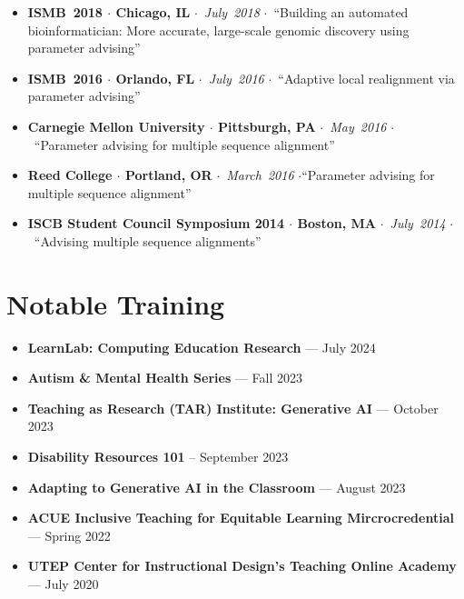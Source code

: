 \documentclass[10pt,letterpaper]{article}
\newcommand{\bigdot}{$\cdot$\xspace}
\begin{document}
\begin{itemize}[leftmargin=*,labelindent=5pt,itemindent=-15pt]
    \item \textbf{ISMB~2018 \bigdot Chicago, IL} \bigdot~\textit{July~2018} \bigdot~``Building an automated bioinformatician: More accurate, large-scale genomic discovery using parameter advising''
    \item \textbf{ISMB~2016 \bigdot Orlando, FL} \bigdot~\textit{July~2016} \bigdot~``Adaptive local realignment via parameter advising'' 
    \item \textbf{Carnegie Mellon University \bigdot Pittsburgh, PA} \bigdot~\textit{May~2016} \bigdot~``Parameter advising for multiple sequence alignment''
    \item \textbf{Reed College \bigdot Portland, OR} \bigdot~\textit{March~2016} \bigdot ``Parameter advising for multiple sequence alignment''
    \item \textbf{ISCB Student Council Symposium 2014 \bigdot  Boston, MA} \bigdot~\textit{July~2014} \bigdot~``Advising multiple sequence alignments''
   
\end{itemize}

\section*{Notable Training}
\begin{itemize}
\item\textbf{LearnLab: Computing Education Research} --- July 2024
\item\textbf{Autism \& Mental Health Series} --- Fall 2023
\item\textbf{Teaching as Research (TAR) Institute: Generative AI} --- October 2023
\item\textbf{Disability Resources 101} -- September 2023
\item\textbf{Adapting to Generative AI in the Classroom} --- August 2023
\item\textbf{ACUE Inclusive Teaching for Equitable Learning Mircrocredential} --- Spring 2022 
\item\textbf{UTEP Center for Instructional Design's Teaching Online Academy} --- July 2020
\end{itemize}

\end{document}
